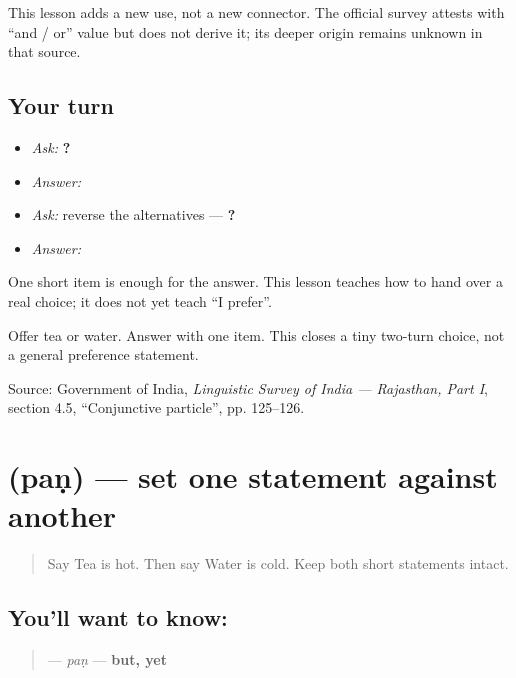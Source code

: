 \begin{cousinweb}
This lesson adds a new use, not a new connector. The official survey attests \textbf{} with “and / or” value but does not derive it; its deeper origin remains unknown in that source.
\end{cousinweb}

\subsection*{Your turn}
\begin{itemize}
\raggedright
  \item \emph{Ask:} \textbf{  ?}
  \item \emph{Answer:} \textbf{}
  \item \emph{Ask:} reverse the alternatives — \textbf{  ?}
  \item \emph{Answer:} \textbf{}
\end{itemize}

One short item is enough for the answer. This lesson teaches how to hand over a real choice; it does not yet teach “I prefer”.

\begin{tcolorbox}[breakable,colback=teal!4,colframe=teal!35!black,title={Before you move on}]
Offer tea or water. Answer with one item. This closes a tiny two-turn choice, not a general preference statement.

Source: Government of India, \emph{Linguistic Survey of India — Rajasthan, Part I}, section 4.5, “Conjunctive particle”, pp. 125–126.
\end{tcolorbox}
\section[\texorpdfstring{\mw{पण} (paṇ)}{पण (paṇ)}]{ (paṇ) — set one statement against another}

\label{lesson:MW-C151-pan-contrast}



\begin{quote}
Say \textbf{  } Tea is hot. Then say \textbf{  } Water is cold. Keep both short statements intact.
\end{quote}

\subsection*{You'll want to know: }
\begin{quote}
\textbf{} — \emph{paṇ} — \textbf{but, yet}
\end{quote}

